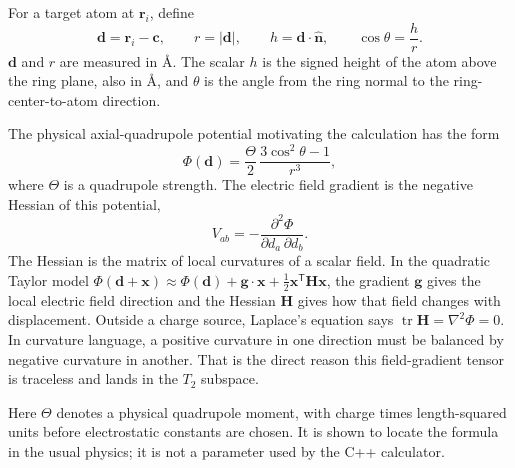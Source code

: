 \documentclass[11pt]{article}
\begin{document}
For a target atom at \(\bm r_i\), define
\begin{equation}
  \bm d = \bm r_i-\bm c,\qquad
  r=|\bm d|,\qquad
  h=\bm d\cdot\hat{\bm n},\qquad
  \cos\theta = \frac{h}{r}.
  \label{eq:ring-geometry}
\end{equation}
\(\bm d\) and \(r\) are measured in \(\si{\angstrom}\). The scalar \(h\) is
the signed height of the atom above the ring plane, also in
\(\si{\angstrom}\), and \(\theta\) is the angle from the ring normal to the
ring-center-to-atom direction.

The physical axial-quadrupole potential motivating the calculation has the
form
\begin{equation}
  \Phi(\bm d) =
  \frac{\Theta}{2}\,
  \frac{3\cos^2\theta-1}{r^3},
  \label{eq:potential}
\end{equation}
where \(\Theta\) is a quadrupole strength. The electric field gradient is the
negative Hessian of this potential,
\begin{equation}
  V_{ab} = -\frac{\partial^2\Phi}{\partial d_a\,\partial d_b}.
  \label{eq:efg}
\end{equation}
The Hessian is the matrix of local curvatures of a scalar field. In the
quadratic Taylor model
\(\Phi(\bm d+\bm x)\approx \Phi(\bm d)+\bm g\cdot\bm x+
\frac12\bm x^{\mathsf T}\bm H\bm x\), the gradient \(\bm g\) gives the local
electric field direction and the Hessian \(\bm H\) gives how that field changes
with displacement. Outside a charge source, Laplace's equation says
\(\operatorname{tr}\bm H=\nabla^2\Phi=0\). In curvature language, a positive
curvature in one direction must be balanced by negative curvature in another.
That is the direct reason this field-gradient tensor is traceless and lands in
the \(T_2\) subspace.

Here \(\Theta\) denotes a physical quadrupole moment, with charge times
length-squared units before electrostatic constants are chosen. It is shown to
locate the formula in the usual physics; it is not a parameter used by the C++
calculator.
\end{document}
